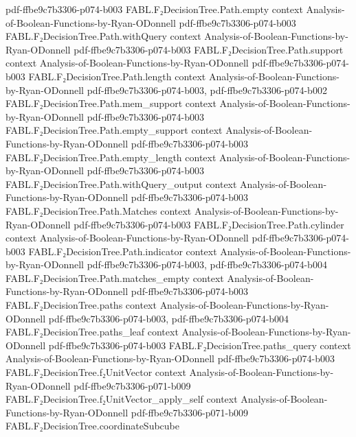 \begin{theorem}
  {pdf-ffbe9c7b3306-p074-b003}
\proofstep
  {FABL.F₂DecisionTree.Path.empty}
  {context}
  {Analysis-of-Boolean-Functions-by-Ryan-ODonnell}
  {pdf-ffbe9c7b3306-p074-b003}
\proofstep
  {FABL.F₂DecisionTree.Path.withQuery}
  {context}
  {Analysis-of-Boolean-Functions-by-Ryan-ODonnell}
  {pdf-ffbe9c7b3306-p074-b003}
\proofstep
  {FABL.F₂DecisionTree.Path.support}
  {context}
  {Analysis-of-Boolean-Functions-by-Ryan-ODonnell}
  {pdf-ffbe9c7b3306-p074-b003}
\proofstep
  {FABL.F₂DecisionTree.Path.length}
  {context}
  {Analysis-of-Boolean-Functions-by-Ryan-ODonnell}
  {pdf-ffbe9c7b3306-p074-b003,
    pdf-ffbe9c7b3306-p074-b002}
\proofstep
  {FABL.F₂DecisionTree.Path.mem_support}
  {context}
  {Analysis-of-Boolean-Functions-by-Ryan-ODonnell}
  {pdf-ffbe9c7b3306-p074-b003}
\proofstep
  {FABL.F₂DecisionTree.Path.empty_support}
  {context}
  {Analysis-of-Boolean-Functions-by-Ryan-ODonnell}
  {pdf-ffbe9c7b3306-p074-b003}
\proofstep
  {FABL.F₂DecisionTree.Path.empty_length}
  {context}
  {Analysis-of-Boolean-Functions-by-Ryan-ODonnell}
  {pdf-ffbe9c7b3306-p074-b003}
\proofstep
  {FABL.F₂DecisionTree.Path.withQuery_output}
  {context}
  {Analysis-of-Boolean-Functions-by-Ryan-ODonnell}
  {pdf-ffbe9c7b3306-p074-b003}
\proofstep
  {FABL.F₂DecisionTree.Path.Matches}
  {context}
  {Analysis-of-Boolean-Functions-by-Ryan-ODonnell}
  {pdf-ffbe9c7b3306-p074-b003}
\proofstep
  {FABL.F₂DecisionTree.Path.cylinder}
  {context}
  {Analysis-of-Boolean-Functions-by-Ryan-ODonnell}
  {pdf-ffbe9c7b3306-p074-b003}
\proofstep
  {FABL.F₂DecisionTree.Path.indicator}
  {context}
  {Analysis-of-Boolean-Functions-by-Ryan-ODonnell}
  {pdf-ffbe9c7b3306-p074-b003,
    pdf-ffbe9c7b3306-p074-b004}
\proofstep
  {FABL.F₂DecisionTree.Path.matches_empty}
  {context}
  {Analysis-of-Boolean-Functions-by-Ryan-ODonnell}
  {pdf-ffbe9c7b3306-p074-b003}
\proofstep
  {FABL.F₂DecisionTree.paths}
  {context}
  {Analysis-of-Boolean-Functions-by-Ryan-ODonnell}
  {pdf-ffbe9c7b3306-p074-b003,
    pdf-ffbe9c7b3306-p074-b004}
\proofstep
  {FABL.F₂DecisionTree.paths_leaf}
  {context}
  {Analysis-of-Boolean-Functions-by-Ryan-ODonnell}
  {pdf-ffbe9c7b3306-p074-b003}
\proofstep
  {FABL.F₂DecisionTree.paths_query}
  {context}
  {Analysis-of-Boolean-Functions-by-Ryan-ODonnell}
  {pdf-ffbe9c7b3306-p074-b003}
\proofstep
  {FABL.F₂DecisionTree.f₂UnitVector}
  {context}
  {Analysis-of-Boolean-Functions-by-Ryan-ODonnell}
  {pdf-ffbe9c7b3306-p071-b009}
\proofstep
  {FABL.F₂DecisionTree.f₂UnitVector_apply_self}
  {context}
  {Analysis-of-Boolean-Functions-by-Ryan-ODonnell}
  {pdf-ffbe9c7b3306-p071-b009}
\proofstep
  {FABL.F₂DecisionTree.coordinateSubcube}

\end{theorem}
